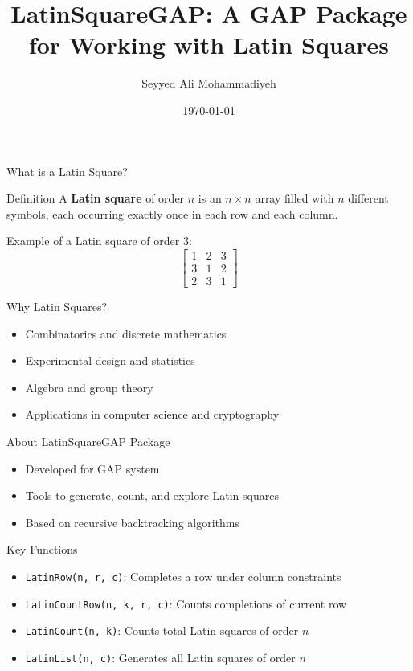 \documentclass{beamer}
\title{LatinSquareGAP: A GAP Package for Working with Latin Squares}
\author{Seyyed Ali Mohammadiyeh}
\institute{GAP Days 2025}
\date{\today}
\begin{document}
	
	\begin{frame}
		\titlepage
	\end{frame}
	
	\begin{frame}{What is a Latin Square?}
		\begin{block}{Definition}
			A \textbf{Latin square} of order $n$ is an $n \times n$ array filled with $n$ different symbols, each occurring exactly once in each row and each column.
		\end{block}
		\pause
		\begin{example}
			Example of a Latin square of order 3:
			\[
			\begin{bmatrix}
				1 & 2 & 3 \\
				3 & 1 & 2 \\
				2 & 3 & 1
			\end{bmatrix}
			\]
		\end{example}
	\end{frame}
	
	\begin{frame}{Why Latin Squares?}
		\begin{itemize}
			\item Combinatorics and discrete mathematics
			\item Experimental design and statistics
			\item Algebra and group theory
			\item Applications in computer science and cryptography
		\end{itemize}
	\end{frame}
	
	\begin{frame}{About LatinSquareGAP Package}
		\begin{itemize}
			\item Developed for GAP system
			\item Tools to generate, count, and explore Latin squares
			\item Based on recursive backtracking algorithms
		\end{itemize}
	\end{frame}
	
	\begin{frame}{Key Functions}
		\begin{itemize}
			\item \texttt{LatinRow(n, r, c)}: Completes a row under column constraints
			\item \texttt{LatinCountRow(n, k, r, c)}: Counts completions of current row
			\item \texttt{LatinCount(n, k)}: Counts total Latin squares of order $n$
			\item \texttt{LatinList(n, c)}: Generates all Latin squares of order $n$
		\end{itemize}
	\end{frame}
	
\end{document}
